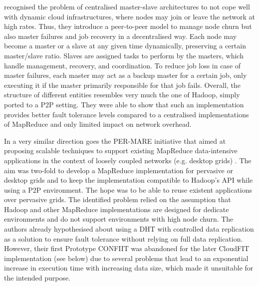 \cite{Marozzo2012a} recognised the problem of centralised master-slave architectures to not cope well with dynamic cloud infrastructures, where nodes may join or leave the network at high rates. Thus, they introduce a peer-to-peer model to manage node churn but also master failures and job recovery in a decentralised way. Each node may become a master or a slave at any given time dynamically, preserving a certain master/slave ratio. Slaves are assigned tasks to perform by the masters, which handle management, recovery, and coordination. To reduce job loss in case of master failures, each master may act as a backup master for a certain job, only executing it if the master primarily responsible for that job fails. Overall, the structure of different entities resembles very much the one of Hadoop, simply ported to a P2P setting. They were able to show that such an implementation provides better fault tolerance levels compared to a centralised implementations of MapReduce and only limited impact on network overhead. 

In a very similar direction goes the PER-MARE initiative that aimed at proposing scalable techniques to support existing MapReduce data-intensive applications in the context of loosely coupled networks (e.g. desktop grids) \cite{Steffenel2013}. The aim was two-fold to develop a MapReduce implementation for pervasive or desktop grids and to keep the implementation compatible to Hadoop's API while using a P2P environment. The hope was to be able to reuse existent applications over pervasive grids. The identified problem relied on the assumption that Hadoop and other MapReduce implementations are designed for dedicate environments and do not support environments with high node churn. The authors already hypothesised about using a DHT with controlled data replication as a solution to ensure fault tolerance without relying on full data replication. However, their first Prototype CONFIIT was abandoned \cite{Steffenel2013a} for the later CloudFIT implementation (see below) due to several problems that lead to an exponential increase in execution time with increasing data size, which made it unsuitable for the intended purpose.

